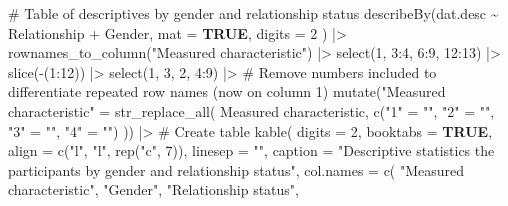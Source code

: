 \documentclass[
  bookmarksnumbered]{article}
\newenvironment{Shaded}{\begin{snugshade}}{\end{snugshade}}
\newcommand{\AttributeTok}[1]{\textcolor[rgb]{0.80,0.80,0.80}{#1}}
\newcommand{\CommentTok}[1]{\textcolor[rgb]{0.50,0.62,0.50}{#1}}
\newcommand{\ConstantTok}[1]{\textcolor[rgb]{0.86,0.64,0.64}{\textbf{#1}}}
\newcommand{\DecValTok}[1]{\textcolor[rgb]{0.86,0.86,0.80}{#1}}
\newcommand{\FunctionTok}[1]{\textcolor[rgb]{0.94,0.94,0.56}{#1}}
\newcommand{\NormalTok}[1]{\textcolor[rgb]{0.80,0.80,0.80}{#1}}
\newcommand{\OtherTok}[1]{\textcolor[rgb]{0.94,0.94,0.56}{#1}}
\newcommand{\SpecialCharTok}[1]{\textcolor[rgb]{0.86,0.64,0.64}{#1}}
\newcommand{\StringTok}[1]{\textcolor[rgb]{0.80,0.58,0.58}{#1}}
\begin{document}
\begin{Shaded}
\begin{Highlighting}[]
\CommentTok{\# Table of descriptives by gender and relationship status}
\FunctionTok{describeBy}\NormalTok{(dat.desc }\SpecialCharTok{\textasciitilde{}}\NormalTok{ Relationship }\SpecialCharTok{+}\NormalTok{ Gender,}
  \AttributeTok{mat =} \ConstantTok{TRUE}\NormalTok{,}
  \AttributeTok{digits =} \DecValTok{2}
\NormalTok{) }\SpecialCharTok{|\textgreater{}}
  \FunctionTok{rownames\_to\_column}\NormalTok{(}\StringTok{"Measured characteristic"}\NormalTok{) }\SpecialCharTok{|\textgreater{}}
  \FunctionTok{select}\NormalTok{(}\DecValTok{1}\NormalTok{, }\DecValTok{3}\SpecialCharTok{:}\DecValTok{4}\NormalTok{, }\DecValTok{6}\SpecialCharTok{:}\DecValTok{9}\NormalTok{, }\DecValTok{12}\SpecialCharTok{:}\DecValTok{13}\NormalTok{) }\SpecialCharTok{|\textgreater{}}
  \FunctionTok{slice}\NormalTok{(}\SpecialCharTok{{-}}\NormalTok{(}\DecValTok{1}\SpecialCharTok{:}\DecValTok{12}\NormalTok{)) }\SpecialCharTok{|\textgreater{}}
  \FunctionTok{select}\NormalTok{(}\DecValTok{1}\NormalTok{, }\DecValTok{3}\NormalTok{, }\DecValTok{2}\NormalTok{, }\DecValTok{4}\SpecialCharTok{:}\DecValTok{9}\NormalTok{) }\SpecialCharTok{|\textgreater{}}
  \CommentTok{\# Remove numbers included to differentiate repeated row names (now on column 1)}
  \FunctionTok{mutate}\NormalTok{(}\StringTok{"Measured characteristic"} \OtherTok{=} \FunctionTok{str\_replace\_all}\NormalTok{(}
    \StringTok{\textasciigrave{}}\AttributeTok{Measured characteristic}\StringTok{\textasciigrave{}}\NormalTok{,}
    \FunctionTok{c}\NormalTok{(}\StringTok{"1"} \OtherTok{=} \StringTok{""}\NormalTok{, }\StringTok{"2"} \OtherTok{=} \StringTok{""}\NormalTok{, }\StringTok{"3"} \OtherTok{=} \StringTok{""}\NormalTok{, }\StringTok{"4"} \OtherTok{=} \StringTok{""}\NormalTok{)}
\NormalTok{  )) }\SpecialCharTok{|\textgreater{}}
  \CommentTok{\# Create table}
  \FunctionTok{kable}\NormalTok{(}
    \AttributeTok{digits =} \DecValTok{2}\NormalTok{,}
    \AttributeTok{booktabs =} \ConstantTok{TRUE}\NormalTok{,}
    \AttributeTok{align =} \FunctionTok{c}\NormalTok{(}\StringTok{"l"}\NormalTok{, }\StringTok{"l"}\NormalTok{, }\FunctionTok{rep}\NormalTok{(}\StringTok{"c"}\NormalTok{, }\DecValTok{7}\NormalTok{)),}
    \AttributeTok{linesep =} \StringTok{""}\NormalTok{,}
    \AttributeTok{caption =} \StringTok{"Descriptive statistics the participants by gender}
\StringTok{        and relationship status"}\NormalTok{,}
    \AttributeTok{col.names =} \FunctionTok{c}\NormalTok{(}
      \StringTok{"Measured characteristic"}\NormalTok{, }\StringTok{"Gender"}\NormalTok{, }\StringTok{"Relationship status"}\NormalTok{,}

\end{Highlighting}
\end{Shaded}
\end{document}

